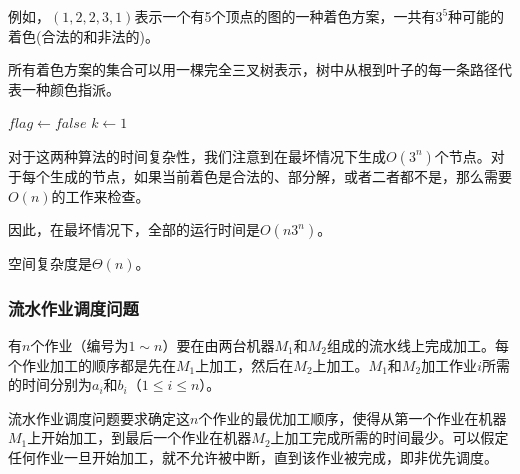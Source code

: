 \documentclass[./../main.tex]{subfiles}
\begin{document}
例如，$(1,2,2,3,1)$表示一个有5个顶点的图的一种着色方案，一共有$3^{5}$种可能的着色(合法的和非法的)。

所有着色方案的集合可以用一棵完全三叉树表示，树中从根到叶子的每一条路径代表一种颜色指派。

\begin{algorithm}[H]
\caption{COLORITER（迭代图着色算法）}
\SetAlgoLined
{}

$flag \leftarrow false$ 
$k \leftarrow 1$ 


\end{algorithm}
对于这两种算法的时间复杂性，我们注意到在最坏情况下生成$O(3^n)$个节点。对于每个生成的节点，如果当前着色是合法的、部分解，或者二者都不是，那么需要$O(n)$的工作来检查。

因此，在最坏情况下，全部的运行时间是$O(n3^n)$。

空间复杂度是$\Theta(n)$。

\subsubsection{流水作业调度问题}
有$n$个作业（编号为$1\sim n$）要在由两台机器$M_1$和$M_2$组成的流水线上完成加工。每个作业加工的顺序都是先在$M_1$上加工，然后在$M_2$上加工。$M_1$和$M_2$加工作业$i$所需的时间分别为$a_{i}$和$b_{i}$（$1\leqslant i\leqslant n$）。

流水作业调度问题要求确定这$n$个作业的最优加工顺序，使得从第一个作业在机器$M_1$上开始加工，到最后一个作业在机器$M_2$上加工完成所需的时间最少。可以假定任何作业一旦开始加工，就不允许被中断，直到该作业被完成，即非优先调度。
\end{document}
